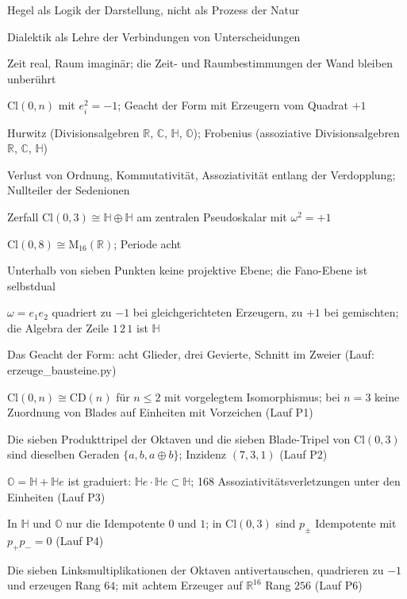 \documentclass[11pt,a4paper]{article}
\newcommand{\R}{\mathbb R}
\newcommand{\C}{\mathbb C}
\newcommand{\HH}{\mathbb H}
\newcommand{\Oc}{\mathbb O}
\newcommand{\Cl}{\mathrm{Cl}}
\newcommand{\M}{\mathrm M}
\begin{document}
\begin{description}[itemsep=1pt,font=\normalfont\bfseries]
\item[Festlegung:] Hegel als Logik der Darstellung, nicht als Prozess der Natur
\item[Festlegung:] Dialektik als Lehre der Verbindungen von Unterscheidungen
\item[Festlegung:] Zeit real, Raum imaginär; die Zeit- und Raumbestimmungen der Wand bleiben unberührt
\item[Festlegung:] $\Cl(0,n)$ mit $e_i^2=-1$; Geacht der Form mit Erzeugern vom Quadrat $+1$
\item[Theorem:] Hurwitz (Divisionsalgebren $\R$, $\C$, $\HH$, $\Oc$); Frobenius (assoziative Divisionsalgebren $\R$, $\C$, $\HH$)
\item[Theorem:] Verlust von Ordnung, Kommutativität, Assoziativität entlang der Verdopplung; Nullteiler der Sedenionen
\item[Theorem:] Zerfall $\Cl(0,3)\cong\HH\oplus\HH$ am zentralen Pseudoskalar mit $\omega^2=+1$
\item[Theorem:] $\Cl(0,8)\cong\M_{16}(\R)$; Periode acht
\item[Theorem:] Unterhalb von sieben Punkten keine projektive Ebene; die Fano-Ebene ist selbstdual
\item[Satz:] $\omega=e_1e_2$ quadriert zu $-1$ bei gleichgerichteten Erzeugern, zu $+1$ bei gemischten; die Algebra der Zeile $1\,2\,1$ ist $\HH$
\item[Satz:] Das Geacht der Form: acht Glieder, drei Gevierte, Schnitt im Zweier (Lauf: erzeuge\_bausteine.py)
\item[Satz:] $\Cl(0,n)\cong\mathrm{CD}(n)$ für $n\le2$ mit vorgelegtem Isomorphismus; bei $n=3$ keine Zuordnung von Blades auf Einheiten mit Vorzeichen (Lauf P1)
\item[Satz:] Die sieben Produkttripel der Oktaven und die sieben Blade-Tripel von $\Cl(0,3)$ sind dieselben Geraden $\{a,b,a\oplus b\}$; Inzidenz $(7,3,1)$ (Lauf P2)
\item[Satz:] $\Oc=\HH+\HH e$ ist graduiert: $\HH e\cdot\HH e\subset\HH$; 168 Assoziativitätsverletzungen unter den Einheiten (Lauf P3)
\item[Satz:] In $\HH$ und $\Oc$ nur die Idempotente $0$ und $1$; in $\Cl(0,3)$ sind $p_\pm$ Idempotente mit $p_+p_-=0$ (Lauf P4)
\item[Satz:] Die sieben Linksmultiplikationen der Oktaven antivertauschen, quadrieren zu $-1$ und erzeugen Rang $64$; mit achtem Erzeuger auf $\R^{16}$ Rang $256$ (Lauf P6)

\end{description}
\end{document}
